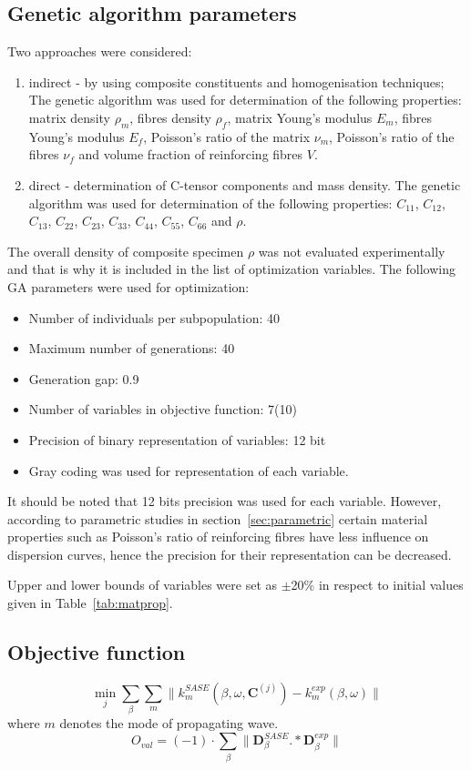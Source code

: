 \documentclass[preprint,12pt]{elsarticle}
\newcommand{\matr}[1]{\mathbf{#1}} %
\begin{document}
	\subsection{Genetic algorithm parameters}
	Two approaches were considered:
	\begin{enumerate}
	\item indirect - by using composite constituents and homogenisation techniques;
	The genetic algorithm was used for determination of the following properties:  matrix density $\rho_m$, fibres density $\rho_f$, matrix Young's modulus $E_m$, fibres Young's modulus $E_f$, Poisson's ratio of the matrix $\nu_m$, Poisson's ratio of the fibres $\nu_f$ and volume fraction of reinforcing fibres $V$. 
	\item direct - determination of C-tensor components and mass density.
	The genetic algorithm was used for determination of the following properties: $C_{11}$, $C_{12}$, $C_{13}$,  $C_{22}$, $C_{23}$, $C_{33}$, $C_{44}$, $C_{55}$, $C_{66}$ and $\rho$.
	\end{enumerate}
	The overall density of composite specimen $\rho$ was not evaluated experimentally and that is why it is included in the list of optimization variables.
	The following GA parameters were used for optimization:
	\begin{itemize}
		\item Number of individuals per subpopulation: 40
		\item Maximum number of generations: 40
		\item Generation gap: 0.9
		\item Number of variables in objective function: 7(10)
		\item Precision of binary representation of variables: 12 bit
		\item Gray coding was used for representation of each variable.
   \end{itemize}
    It should be noted that 12 bits precision was used for each variable. However, according to parametric studies in section~\ref{sec:parametric} certain material properties such as Poisson's ratio of reinforcing fibres have less influence on dispersion curves, hence the precision for their representation can be decreased.
  
	Upper and lower bounds of variables were set as  $\pm$20\% in respect to initial values given in Table~\ref{tab:matprop}.
	\subsection{Objective function}
	\begin{equation}
	\min_j \sum_{\beta}\sum_{m} \| k^{SASE}_{m}(\beta, \omega,\matr{C}^{(j)}) -k^{exp}_{m}(\beta,\omega) \|
	\end{equation}
	where $m$ denotes the mode of propagating wave.
	\begin{equation}
	O_{val} = (-1)  \cdot \sum_{\beta} \| \matr{D}^{SASE}_{\beta}  .*  \matr{D}^{exp}_{\beta} \|
	\end{equation}
\end{document}
